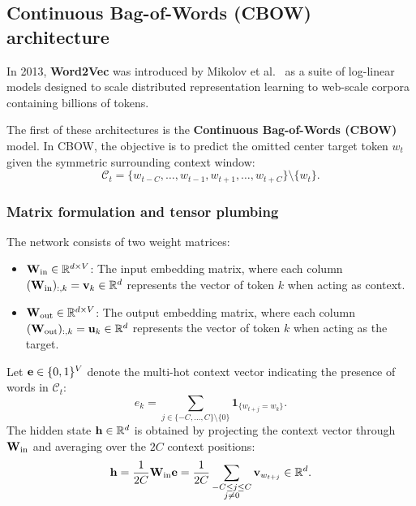\documentclass[../../../main.tex]{subfiles}
\begin{document}
\clearpage

\subsection{Continuous Bag-of-Words (CBOW) architecture}
\label{sec:cbow_architecture}

In 2013, \textbf{Word2Vec} was introduced by Mikolov et al.~\cite{mikolov2013efficient,mikolov2013distributed} as a suite of log-linear models designed to scale distributed representation learning to web-scale corpora containing billions of tokens.

The first of these architectures is the \textbf{Continuous Bag-of-Words (CBOW)} model. In CBOW, the objective is to predict the omitted center target token $w_t$ given the symmetric surrounding context window:
\begin{equation}
\label{eq:cbow_context_def}
\mathcal{C}_t = \{w_{t-C}, \dots, w_{t-1}, w_{t+1}, \dots, w_{t+C}\} \setminus \{w_t\}.
\end{equation}

\subsubsection{Matrix formulation and tensor plumbing}
\label{subsec:cbow_math_formulation}

The network consists of two weight matrices:
\begin{itemize}
    \item $\mathbf{W}_{\text{in}} \in \mathbb{R}^{d \times V}$: The input embedding matrix, where each column $(\mathbf{W}_{\text{in}})_{:, k} = \mathbf{v}_k \in \mathbb{R}^d$ represents the vector of token $k$ when acting as context.
    \item $\mathbf{W}_{\text{out}} \in \mathbb{R}^{d \times V}$: The output embedding matrix, where each column $(\mathbf{W}_{\text{out}})_{:, k} = \mathbf{u}_k \in \mathbb{R}^d$ represents the vector of token $k$ when acting as the target.
\end{itemize}

Let $\mathbf{e} \in \{0, 1\}^V$ denote the multi-hot context vector indicating the presence of words in $\mathcal{C}_t$:
\begin{equation}
\label{eq:context_indicator}
e_k = \sum_{j \in \{-C, \dots, C\} \setminus \{0\}} \mathbf{1}_{\{w_{t+j} = w_k\}}.
\end{equation}
The hidden state $\mathbf{h} \in \mathbb{R}^d$ is obtained by projecting the context vector through $\mathbf{W}_{\text{in}}$ and averaging over the $2C$ context positions:
\begin{equation}
\label{eq:cbow_hidden_avg}
\mathbf{h} = \frac{1}{2C} \mathbf{W}_{\text{in}} \mathbf{e} = \frac{1}{2C} \sum_{\substack{-C \le j \le C \\ j \neq 0}} \mathbf{v}_{w_{t+j}} \in \mathbb{R}^d.
\end{equation}
\end{document}
